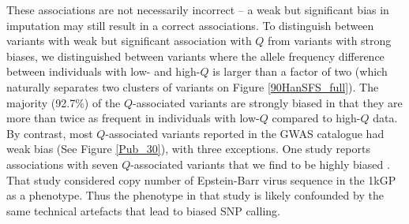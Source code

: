 \documentclass[9pt,lineno]{template}
\begin{document}
These associations are not necessarily incorrect -- a weak but significant bias in imputation may still result in a correct associations. 
To distinguish between variants with weak but significant association with $Q$ from variants with strong biases, we distinguished between variants where the allele frequency difference between individuals with low- and high-$Q$ is larger than a factor of two (which naturally separates two clusters of variants on Figure \ref{90HanSFS_full}).
The majority (92.7\%) of the $Q$-associated variants are strongly biased in that they are more than twice as frequent in individuals with low-$Q$ compared to high-$Q$ data.
By contrast, most $Q$-associated variants reported in the GWAS catalogue had weak bias (See Figure \ref{Pub_30}), with three exceptions.
One study reports associations with seven $Q$-associated variants that we find to be highly biased \citep{Mandage2017}. 
That study considered copy number of Epstein-Barr virus sequence in the 1kGP as a phenotype. 
Thus the phenotype in that study is likely confounded by the same technical artefacts that lead to biased SNP calling.
\end{document}
